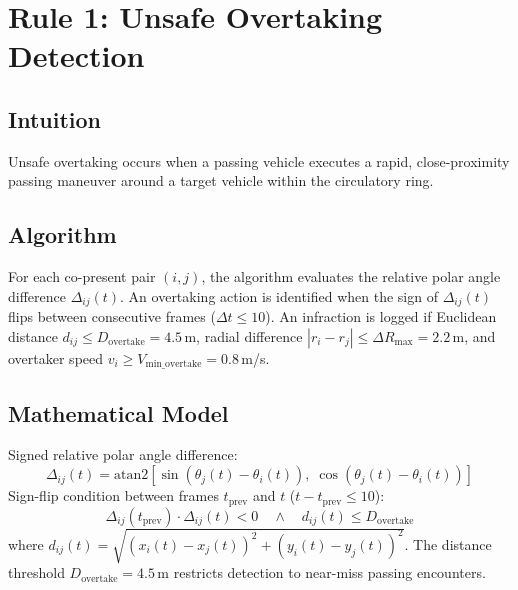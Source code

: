 \documentclass[12pt,a4paper]{report}
\begin{document}
\section{Rule 1: Unsafe Overtaking Detection}
\label{sec:rule1}

\subsection{Intuition}
Unsafe overtaking occurs when a passing vehicle executes a rapid, close-proximity passing maneuver around a target vehicle within the circulatory ring.

\subsection{Algorithm}
For each co-present pair $(i, j)$, the algorithm evaluates the relative polar angle difference $\Delta_{ij}(t)$. An overtaking action is identified when the sign of $\Delta_{ij}(t)$ flips between consecutive frames ($\Delta t \le 10$). An infraction is logged if Euclidean distance $d_{ij} \le D_{\text{overtake}} = 4.5$\,m, radial difference $|r_i - r_j| \le \Delta R_{\text{max}} = 2.2$\,m, and overtaker speed $v_i \ge V_{\text{min\_overtake}} = 0.8$\,m/s.

\subsection{Mathematical Model}
Signed relative polar angle difference:
\begin{equation}
    \Delta_{ij}(t) = \mathrm{atan2}\!\left[\sin(\theta_j(t)-\theta_i(t)),\;\cos(\theta_j(t)-\theta_i(t))\right]
\end{equation}
Sign-flip condition between frames $t_{\text{prev}}$ and $t$ ($t - t_{\text{prev}} \le 10$):
\begin{equation}
    \Delta_{ij}(t_{\text{prev}}) \cdot \Delta_{ij}(t) < 0 \quad\land\quad d_{ij}(t) \le D_{\text{overtake}}
\end{equation}
where $d_{ij}(t) = \sqrt{(x_i(t)-x_j(t))^2 + (y_i(t)-y_j(t))^2}$. The distance threshold $D_{\text{overtake}} = 4.5$\,m restricts detection to near-miss passing encounters.
\end{document}
